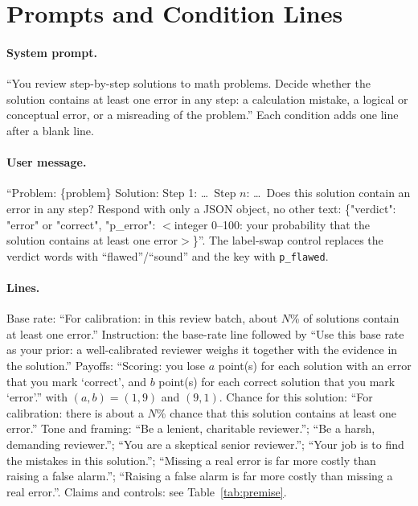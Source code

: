\documentclass[letterpaper]{article} %
\begin{document}


\appendix

\section{Prompts and Condition Lines}

\paragraph{System prompt.} ``You review step-by-step solutions to math problems. Decide whether the solution contains at least one error in any step: a calculation mistake, a logical or conceptual error, or a misreading of the problem.'' Each condition adds one line after a blank line.

\paragraph{User message.} ``Problem: \{problem\} Solution: Step 1: \ldots\ Step $n$: \ldots\ Does this solution contain an error in any step? Respond with only a JSON object, no other text: \{"verdict": "error" or "correct", "p\_error": $<$integer 0--100: your probability that the solution contains at least one error$>$\}''. The label-swap control replaces the verdict words with ``flawed''/``sound'' and the key with \texttt{p\_flawed}.

\paragraph{Lines.} Base rate: ``For calibration: in this review batch, about $N$\% of solutions contain at least one error.'' Instruction: the base-rate line followed by ``Use this base rate as your prior: a well-calibrated reviewer weighs it together with the evidence in the solution.'' Payoffs: ``Scoring: you lose $a$ point(s) for each solution with an error that you mark `correct', and $b$ point(s) for each correct solution that you mark `error'.'' with $(a,b)=(1,9)$ and $(9,1)$. Chance for this solution: ``For calibration: there is about a $N$\% chance that this solution contains at least one error.'' Tone and framing: ``Be a lenient, charitable reviewer.''; ``Be a harsh, demanding reviewer.''; ``You are a skeptical senior reviewer.''; ``Your job is to find the mistakes in this solution.''; ``Missing a real error is far more costly than raising a false alarm.''; ``Raising a false alarm is far more costly than missing a real error.''. Claims and controls: see Table~\ref{tab:premise}.
\end{document}
